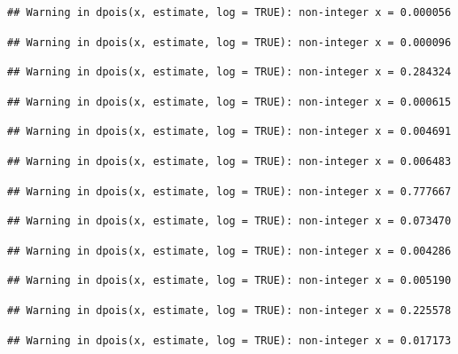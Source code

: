 \documentclass[]{article}
\begin{document}
\begin{verbatim}
## Warning in dpois(x, estimate, log = TRUE): non-integer x = 0.000056
\end{verbatim}

\begin{verbatim}
## Warning in dpois(x, estimate, log = TRUE): non-integer x = 0.000096
\end{verbatim}

\begin{verbatim}
## Warning in dpois(x, estimate, log = TRUE): non-integer x = 0.284324
\end{verbatim}

\begin{verbatim}
## Warning in dpois(x, estimate, log = TRUE): non-integer x = 0.000615
\end{verbatim}

\begin{verbatim}
## Warning in dpois(x, estimate, log = TRUE): non-integer x = 0.004691
\end{verbatim}

\begin{verbatim}
## Warning in dpois(x, estimate, log = TRUE): non-integer x = 0.006483
\end{verbatim}

\begin{verbatim}
## Warning in dpois(x, estimate, log = TRUE): non-integer x = 0.777667
\end{verbatim}

\begin{verbatim}
## Warning in dpois(x, estimate, log = TRUE): non-integer x = 0.073470
\end{verbatim}

\begin{verbatim}
## Warning in dpois(x, estimate, log = TRUE): non-integer x = 0.004286
\end{verbatim}

\begin{verbatim}
## Warning in dpois(x, estimate, log = TRUE): non-integer x = 0.005190
\end{verbatim}

\begin{verbatim}
## Warning in dpois(x, estimate, log = TRUE): non-integer x = 0.225578
\end{verbatim}

\begin{verbatim}
## Warning in dpois(x, estimate, log = TRUE): non-integer x = 0.017173
\end{verbatim}
\end{document}
